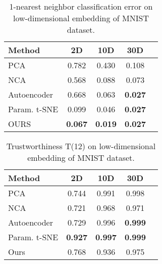 \documentclass[10pt,twocolumn,letterpaper]{article}
\begin{document}
\begin{table}[t]
\caption{1-nearest neighbor classification error on low-dimensional embedding of MNIST dataset.}
\vspace{-10pt}
\center
\begin{tabular}{@{}lcccc@{}}
  \toprule
  Method   &2D &10D &30D   \\   
  \midrule  
  PCA \cite{wold1987principal}           &0.782  &0.430  &0.108  \\
  NCA \cite{roweis2004neighbourhood}     &0.568  &0.088  &0.073  \\
  Autoencoder \cite{hinton2006reducing}  &0.668  &0.063
&\textbf{0.027} \\
  Param. t-SNE \cite{maaten2009learning} &0.099  &0.046  &\textbf{0.027}  \\  
  OURS       &\textbf{0.067}  &\textbf{0.019}  & \textbf{0.027} \\
  \bottomrule
\end{tabular}
\label{TB_1NN_Classification}
\end{table}

\begin{table}[t]
\caption{Trustworthiness T(12) on low-dimensional embedding of MNIST dataset.}
\vspace{-10pt}
\center
\begin{tabular}{@{}lcccc@{}}
  \toprule
  Method   &2D &10D &30D   \\   
  \midrule  
  PCA \cite{wold1987principal}          &0.744  &0.991  &0.998  \\
  NCA \cite{roweis2004neighbourhood}    &0.721  &0.968  &0.971  \\
  Autoencoder \cite{hinton2006reducing} &0.729  &0.996
&\textbf{0.999}\\
  Param. t-SNE \cite{maaten2009learning}&\textbf{0.927}  &\textbf{0.997}  &\textbf{0.999}  \\  
  Ours      &0.768  &0.936  &0.975  \\
  \bottomrule
\end{tabular}
\label{TB_Trustworthiness}
\end{table}
\end{document}
